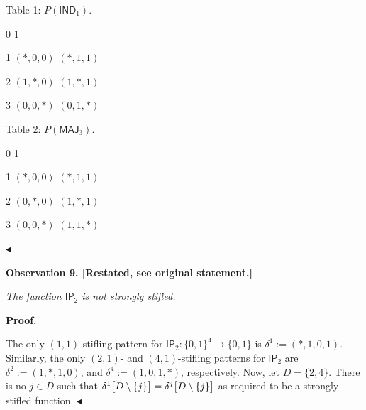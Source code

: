 \documentclass[10pt,a4paper]{article}
\begin{document}
Table 1: $P(\mathsf{IND}_{1})$.




0
1




1
$(*,0,0)$
$(*,1,1)$


2
$(1,*,0)$
$(1,*,1)$


3
$(0,0,*)$
$(0,1,*)$







Table 2: $P(\mathsf{MAJ}_{3})$.




0
1




1
$(*,0,0)$
$(*,1,1)$


2
$(0,*,0)$
$(1,*,1)$


3
$(0,0,*)$
$(1,1,*)$









$\blacktriangleleft$\par






\par\medskip\noindent\textbf{
\textbf{Observation 9}\textbf{.}
[Restated, see original statement.]}\par



\emph{The function $\mathsf{IP}_{2}$ is not strongly stifled.}\par








\par\medskip\noindent\textbf{Proof.}\par




The only $(1,1)$-stifling pattern for $\mathsf{IP}_{2}:\{0,1\}^{4}\to\{0,1\}$ is $\delta^{1}:=(*,1,0,1)$.
Similarly, the only $(2,1)$- and $(4,1)$-stifling patterns for $\mathsf{IP}_{2}$ are $\delta^{2}:=(1,*,1,0)$, and $\delta^{4}:=(1,0,1,*)$, respectively.
Now, let $D=\{2,4\}$.
There is no $j\in D$ such that $\delta^{1}\bigl{[}D\setminus\{j\}\bigr{]}=\delta^{j}\bigl{[}D\setminus\{j\}%
\bigr{]}$ as required to be a strongly stifled function.
$\blacktriangleleft$\par




\par
\end{document}
